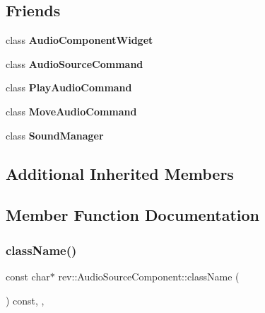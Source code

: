 \subsection*{Friends}
\begin{DoxyCompactItemize}
\item 
\mbox{\label{classrev_1_1_audio_source_component_abcf6a9cabe9f178e3c032faa7f496d50}} 
class {\bfseries Audio\+Component\+Widget}
\item 
\mbox{\label{classrev_1_1_audio_source_component_a712297203e2f33c19e0ff8799b37c69b}} 
class {\bfseries Audio\+Source\+Command}
\item 
\mbox{\label{classrev_1_1_audio_source_component_aafc1ed305dd233e1f87f16711af11e29}} 
class {\bfseries Play\+Audio\+Command}
\item 
\mbox{\label{classrev_1_1_audio_source_component_a767cf7740fa172ae8e804bd537aff424}} 
class {\bfseries Move\+Audio\+Command}
\item 
\mbox{\label{classrev_1_1_audio_source_component_aee940642f2974e262db9284c0b1d9766}} 
class {\bfseries Sound\+Manager}
\end{DoxyCompactItemize}
\subsection*{Additional Inherited Members}


\subsection{Member Function Documentation}
\mbox{\label{classrev_1_1_audio_source_component_a71a45fbf39573c2d903ad4454ec3d658}} 
\subsubsection{\texorpdfstring{className()}{className()}}
{\footnotesize\ttfamily const char$\ast$ rev\+::\+Audio\+Source\+Component\+::class\+Name (\begin{DoxyParamCaption}{ }\end{DoxyParamCaption}) const\hspace{0.3cm}{\ttfamily [inline]}, {\ttfamily [override]}, {\ttfamily [virtual]}}



